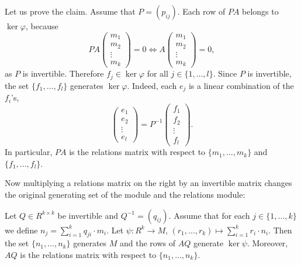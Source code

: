 Let us prove the claim. Assume that $P=(p_{ij})$. Each row of $PA$ belongs to $\ker\varphi$, because
\[
PA\begin{pmatrix}
    m_1\\
    m_2\\
    \vdots\\
    m_k
\end{pmatrix}=0
\Longleftrightarrow 
A\begin{pmatrix}
    m_1\\
    m_2\\
    \vdots\\
    m_k
\end{pmatrix}=0,
\]
as $P$ is invertible. Therefore $f_j\in\ker\varphi$ for all $j\in\{1,\dots,l\}$. 
Since $P$ is invertible, the set $\{f_1,\dots,f_l\}$ generates $\ker\varphi$. Indeed, each 
$e_j$ is a linear combination of the $f_i$'s,  
\[
\begin{pmatrix}
e_1\\
e_2\\
\vdots\\
e_l	
\end{pmatrix}
=P^{-1}\begin{pmatrix}
f_1\\
f_2\\
\vdots\\
f_l
\end{pmatrix}.
\]
In particular, $PA$ is the relations matrix with respect to 
$\{m_1,\dots,m_k\}$ and $\{f_1,\dots,f_l\}$.  

Now multiplying a relations matrix on the right by an invertible matrix 
changes the original generating set of the module and the relations module: 

\begin{claim}
	Let $Q\in R^{k\times k}$ be invertible and 
    $Q^{-1}=(q_{ij})$. Assume that for each
	$j\in\{1,\dots,k\}$ we define $n_j=\sum_{i=1}^k q_{ji}\cdot m_i$. 
    Let $\psi\colon R^k\to M$, $(r_1,\dots,r_k)\mapsto \sum_{i=1}^k r_i\cdot n_i$.
    Then    
    the set
	$\{n_1,\dots,n_k\}$ generates $M$ and the rows of $AQ$ generate
	$\ker\psi$. Moreover, $AQ$ is the relations matrix with respect to
	$\{n_1,\dots,n_k\}$.  
\end{claim}

